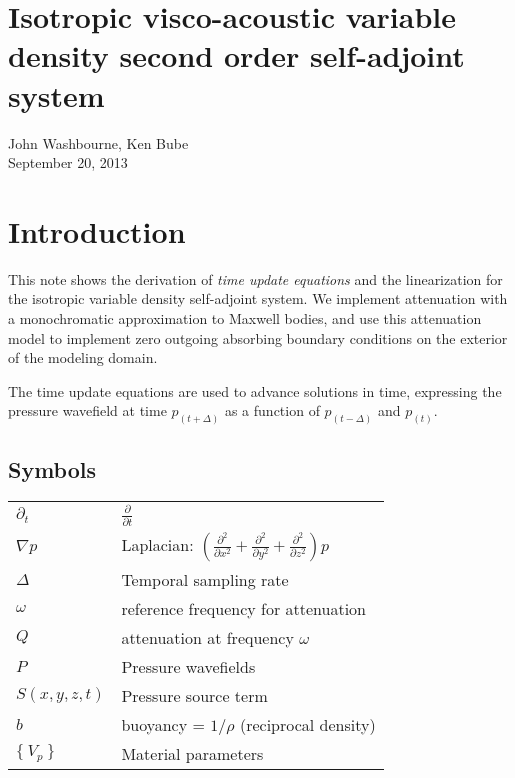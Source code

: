 \documentclass[10pt,fleqn]{article}
\begin{document}
\section{Isotropic visco-acoustic variable density second order self-adjoint system}
John Washbourne, Ken Bube\\
September 20, 2013


\section{Introduction}
This note shows the derivation of \textit{time update equations} and the linearization 
for the isotropic
variable density self-adjoint system. We implement attenuation with a monochromatic
approximation to Maxwell bodies, and use this attenuation model to implement zero
outgoing absorbing boundary conditions on the exterior of the modeling domain.
\vspace{10pt}

The time update equations are used to advance solutions in time, expressing the pressure
wavefield at time $p_{(t + \Delta)}$ as a function of $p_{(t - \Delta)}$ and $p_{(t)}$.

\subsection{Symbols}
\begin{center}
\begin{tabular}{ll} \\[-10pt]
$\partial_t$ & $\displaystyle \frac{\partial }{\partial t}$ \\[10pt]
$\nabla p $ & Laplacian: $ \left(
	\displaystyle \frac{\partial^2 }{\partial x^2} +
	\displaystyle \frac{\partial^2 }{\partial y^2} +
	\displaystyle \frac{\partial^2 }{\partial z^2} \right) p $ \\[15pt]
$\Delta$ & Temporal sampling rate \\[10pt]
$\omega$ & reference frequency for attenuation \\[10pt]
$Q$ & attenuation at frequency $\omega$ \\[10pt]
$P$ & Pressure wavefields\\[10pt]
$S(x,y,z,t)$ & Pressure source term\\[10pt]
$b$ & buoyancy = $\displaystyle 1/\rho $ (reciprocal density) \\[10pt]
$ \{\ V_p\ \} $ & Material parameters \\[10pt]
\end{tabular}
\end{center}
\end{document}
